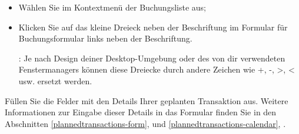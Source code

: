 \begin{itemize}
	\item Wählen Sie im Kontextmenü der Buchungsliste  aus;
	\item Klicken Sie auf das kleine Dreieck neben der Beschriftung  im Formular für Buchungsformular links neben der Beschriftung.
	
	\Note{}: Je nach Design deiner Desktop-Umgebung oder des von dir verwendeten Fenstermanagers können diese Dreiecke durch andere Zeichen wie +, -, >, < usw. ersetzt werden.
\end{itemize}

Füllen Sie die Felder mit den Details Ihrer geplanten Transaktion aus. Weitere Informationen zur Eingabe dieser Details in das Formular finden Sie in den Abschnitten \vref{plannedtransactions-form},  und \vref{plannedtransactions-calendar}, .


